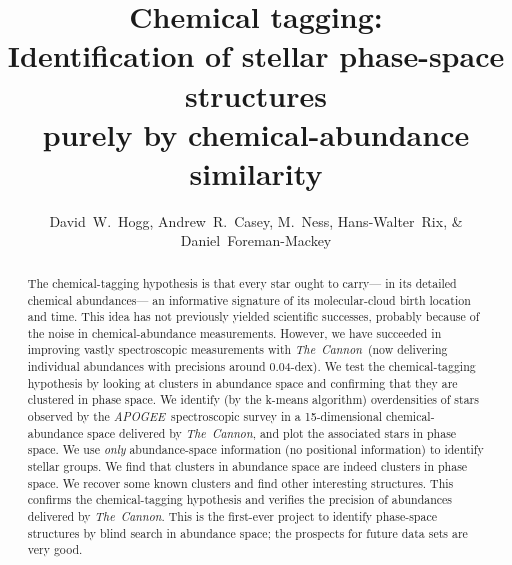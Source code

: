 \documentclass[12pt, letterpaper, preprint]{aastex}
\newcommand{\acronym}[1]{{\small{#1}}}
\newcommand{\project}[1]{\textsl{#1}}
\newcommand{\apogee}{\project{\acronym{APOGEE}}}
\newcommand{\thecannon}{\project{The~Cannon}}
\begin{document}
\sloppy\sloppypar

\title{Chemical tagging: \\
       Identification of stellar phase-space structures \\
       purely by chemical-abundance similarity}
\author{David~W.~Hogg,
        Andrew~R.~Casey,
        M.~Ness,
        Hans-Walter~Rix, \&
        Daniel~Foreman-Mackey}

\begin{abstract}
The chemical-tagging hypothesis is that every star ought to carry---%
in its detailed chemical abundances---%
an informative signature of its molecular-cloud birth location and time.
This idea has not previously yielded scientific successes, probably because of the
noise in chemical-abundance measurements.
However, we have succeeded in improving vastly spectroscopic measurements with \thecannon\ 
(now delivering individual abundances with precisions around 0.04-dex).
We test the chemical-tagging hypothesis by looking at clusters in abundance space
and confirming that they are clustered in phase space.
We identify (by the k-means algorithm) overdensities of stars observed by the \apogee\ spectroscopic survey
in a 15-dimensional chemical-abundance space delivered by \thecannon,
and plot the associated stars in phase space.
We use \emph{only} abundance-space information (no positional information) to identify stellar groups.
We find that clusters in abundance space are indeed clusters in phase space.
We recover some known clusters and find other interesting structures.
This confirms the chemical-tagging hypothesis and verifies the precision of abundances delivered by \thecannon.
This is the first-ever project to identify phase-space structures by blind search in abundance space;
the prospects for future data sets are very good.
\end{abstract}

\end{document}
